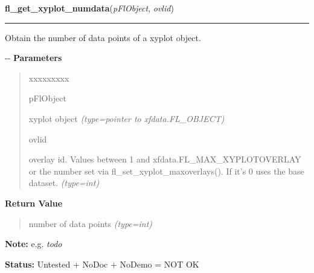     \label{xformslib:flxyplot:fl_get_xyplot_numdata}

    \vspace{0.5ex}

\hspace{.8\funcindent}\begin{boxedminipage}{\funcwidth}

    \raggedright \textbf{fl\_get\_xyplot\_numdata}(\textit{pFlObject}, \textit{ovlid})

    \vspace{-1.5ex}

    \rule{\textwidth}{0.5\fboxrule}
\setlength{\parskip}{2ex}

Obtain the number of data points of a xyplot object.

-{}-
\setlength{\parskip}{1ex}
      \textbf{Parameters}
      \vspace{-1ex}

      \begin{quote}
        \begin{Ventry}{xxxxxxxxx}

          \item[pFlObject]


xyplot object
            {\it (type=pointer to xfdata.FL\_OBJECT)}

          \item[ovlid]


overlay id. Values between 1 and xfdata.FL\_MAX\_XYPLOTOVERLAY or the
number set via fl\_set\_xyplot\_maxoverlays(). If it's 0 uses the base
dataset.
            {\it (type=int)}

        \end{Ventry}

      \end{quote}

      \textbf{Return Value}
    \vspace{-1ex}

      \begin{quote}

number of data points
      {\it (type=int)}

      \end{quote}

\textbf{Note:} 
e.g. \emph{todo}


\textbf{Status:} 
Untested + NoDoc + NoDemo = NOT OK


    \end{boxedminipage}

